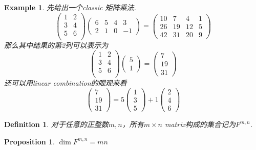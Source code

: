 \documentclass{article}
\newtheorem{proposition}[theorem]{Proposition}
\newtheorem{example}[theorem]{Example}
\newtheorem{definition}[theorem]{Definition}
\begin{document}
\begin{example}
\rm 先给出一个classic 矩阵乘法.
$$
\begin{pmatrix}
1 & 2 \\
3 & 4 \\
5 & 6 \\
\end{pmatrix}
\begin{pmatrix}
6 & 5 & 4 & 3 \\
2 & 1 & 0 & -1
\end{pmatrix} = 
\begin{pmatrix}
10 & 7 & 4 & 1 \\
26 & 19 & 12 & 5 \\
42 & 31 & 20 & 9
\end{pmatrix}
$$
那么其中结果的第2列可以表示为
$$
\begin{pmatrix}
1 & 2 \\
3 & 4 \\
5 & 6 \\
\end{pmatrix}
\begin{pmatrix}
5 \\
1 
\end{pmatrix} = 
\begin{pmatrix}
7 \\
19 \\
31 
\end{pmatrix}
$$
还可以用linear combination的眼观来看
$$
\begin{pmatrix}
7 \\
19 \\
31 
\end{pmatrix} =
5\begin{pmatrix}
1 \\
3 \\
5 
\end{pmatrix} + 
1 \begin{pmatrix}
2 \\
4 \\
6
\end{pmatrix}
$$
\end{example}

\begin{definition}
对于任意的正整数$m,n$，所有$m \times n$ matrix构成的集合记为$F^{m,n}$.
\end{definition}

\begin{proposition}\label{matrix: vector-space-dim}
\rm {\color{red} $\dim F^{m,n} = mn$}
\end{proposition}
\end{document}
